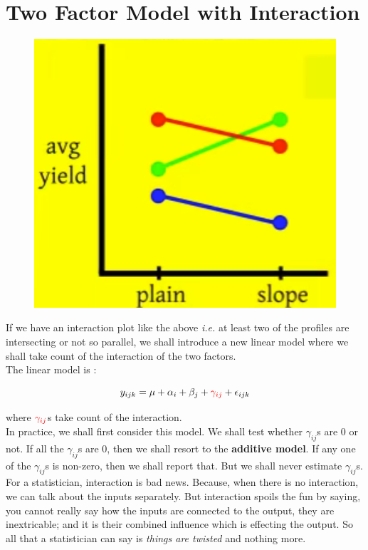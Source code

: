\documentclass[11pt, a4paper]{article}\usepackage[]{graphicx}\usepackage[dvipsnames]{xcolor}
\begin{document}
\section*{Two Factor Model with Interaction}

\begin{figure}[h]
  \centering
  \includegraphics[scale = 0.4]{interaction_plot}
\end{figure}

If we have an interaction plot like the above \textit{i.e.} at least two of the profiles are intersecting or not so parallel, we shall introduce a new linear model where we shall take count of the interaction of the two factors. \\

The linear model is :

$$y_{ijk} = \mu + \alpha_i + \beta_j + \textcolor{red}{\gamma_{ij}} +  \epsilon_{ijk}$$

where $\textcolor{red}{\gamma_{ij}}$s take count of the interaction. \\

In practice, we shall first consider this model. We shall test whether $\gamma_{ij}$s are 0 or not. If all the $\gamma_{ij}$s are 0, then we shall resort to the \textbf{additive model}. If any one of the $\gamma_{ij}$s is non-zero, then we shall report that. But we shall never estimate $\gamma_{ij}$s. \\

For a statistician, interaction is bad news. Because, when there is no interaction, we can talk about the inputs separately. But interaction spoils the fun by saying, you cannot really say how the inputs are connected to the output, they are inextricable; and it is their combined influence which is effecting the output. So all that a statistician can say is \textit{things are twisted} and nothing more. \\
\end{document}
